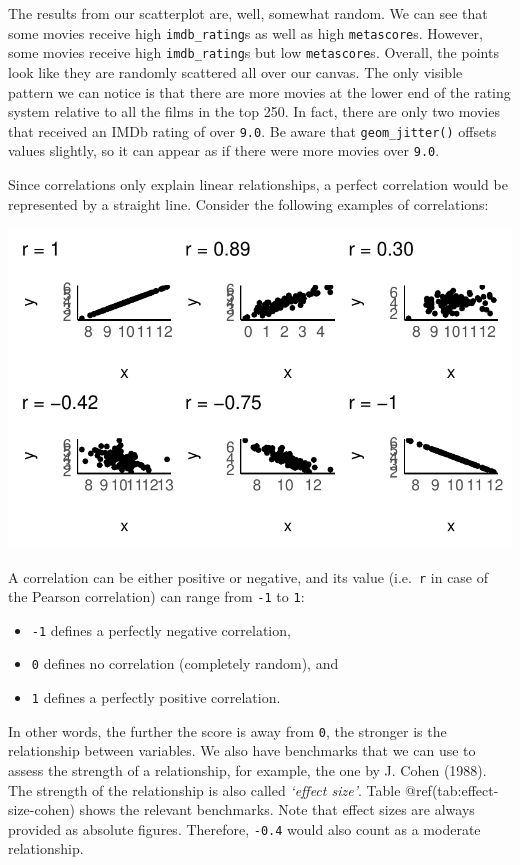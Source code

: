 \documentclass[
  letterpaper,
]{krantz}
\begin{document}
The results from our scatterplot are, well, somewhat random. We can see
that some movies receive high \texttt{imdb\_rating}s as well as high
\texttt{metascore}s. However, some movies receive high
\texttt{imdb\_rating}s but low \texttt{metascore}s. Overall, the points
look like they are randomly scattered all over our canvas. The only
visible pattern we can notice is that there are more movies at the lower
end of the rating system relative to all the films in the top 250. In
fact, there are only two movies that received an IMDb rating of over
\texttt{9.0}. Be aware that \texttt{geom\_jitter()} offsets values
slightly, so it can appear as if there were more movies over
\texttt{9.0}.

Since correlations only explain linear relationships, a perfect
correlation would be represented by a straight line. Consider the
following examples of correlations:

\includegraphics{10_correlations_files/figure-pdf/correlation-examples-1.pdf}

A correlation can be either positive or negative, and its value
(i.e.~\texttt{r} in case of the Pearson correlation) can range from
\texttt{-1} to \texttt{1}:

\begin{itemize}
\item
  \texttt{-1} defines a perfectly negative correlation,
\item
  \texttt{0} defines no correlation (completely random), and
\item
  \texttt{1} defines a perfectly positive correlation.
\end{itemize}

In other words, the further the score is away from \texttt{0}, the
stronger is the relationship between variables. We also have benchmarks
that we can use to assess the strength of a relationship, for example,
the one by J. Cohen (1988). The strength of the relationship is also
called \emph{`effect size'}. Table @ref(tab:effect-size-cohen) shows the
relevant benchmarks. Note that effect sizes are always provided as
absolute figures. Therefore, \texttt{-0.4} would also count as a
moderate relationship.
\end{document}
